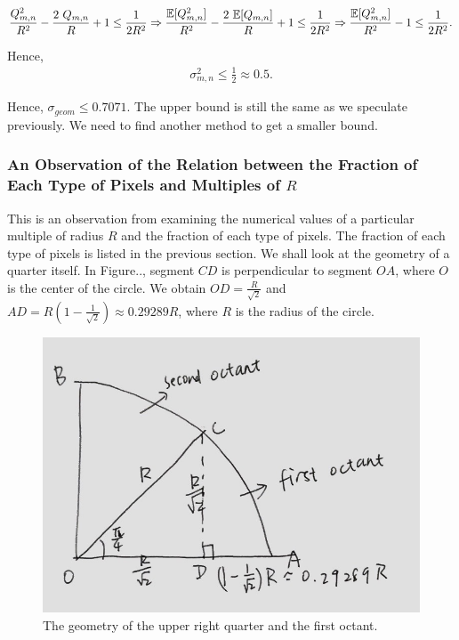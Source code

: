 \documentclass[letterpaper]{article}
\numberwithin{equation}{section} %
\numberwithin{figure}{section} %
\numberwithin{table}{section} %
\begin{document}
\begin{equation}
\frac{Q_{m,n}^2}{R^2}-\frac{2\ Q_{m,n}}{R}+1 \leq \frac{1}{2R^2} \\ \Rightarrow \frac{\mathbb{E}[Q_{m,n}^2]}{R^2}-\frac{2\ \mathbb{E}[Q_{m,n}]}{R}+1 \leq \frac{1}{2R^2} \\
\Rightarrow \frac{\mathbb{E}[Q_{m,n}^2]}{R^2}-1 \leq \frac{1}{2R^2}. \\
\end{equation}

\noindent
Hence,
\begin{align}
\sigma_{m,n}^2 \leq \frac{1}{2} \approx 0.5.
\end{align}

\noindent
Hence, $\sigma_{geom} \leq 0.7071$. The upper bound is still the same as we speculate previously. We need to find another method to get a smaller bound.

\subsubsection{An Observation of the Relation between the Fraction of Each Type of Pixels and Multiples of $R$}

This is an observation from examining the numerical values of a particular multiple of radius $R$ and the fraction of each type of pixels. The fraction of each type of pixels is listed in the previous section. We shall look at the geometry of a quarter itself. In Figure.., segment $CD$ is perpendicular to segment $OA$, where $O$ is the center of the circle. We obtain $OD=\frac{R}{\sqrt{2}}$ and $AD=R(1-\frac{1}{\sqrt{2}}) \approx 0.29289R$, where $R$ is the radius of the circle.

\begin{figure}[h]
	\centering
	\includegraphics[width=0.4\linewidth]{4tyMultR}
	\caption{The geometry of the upper right quarter and the first octant.}
	\label{fig:4tyMultR}
\end{figure}
\end{document}
